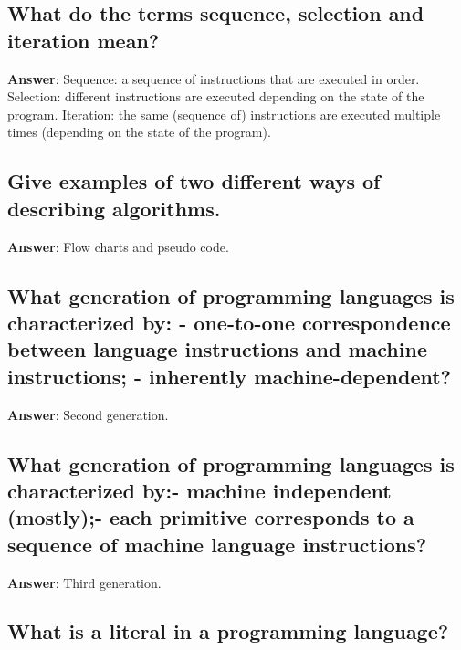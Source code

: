 \documentclass[a4paper,11pt,oneside]{article}
\begin{document}
\begin{sloppypar}
\subsection{What do the terms sequence, selection and iteration mean?}

\label{q:207:sa:en:True}

\textbf{Answer}: Sequence: a sequence of instructions that are executed in order. Selection: different instructions are executed depending on the state of the program. Iteration: the same (sequence of) instructions are executed multiple times (depending on the state of the program).



\subsection{Give examples of two different ways of describing algorithms.}

\label{q:208:sa:en:True}

\textbf{Answer}: Flow charts and pseudo code.



\subsection{What generation of programming languages is characterized by: - one-to-one correspondence between language instructions and machine instructions; - inherently machine-dependent?}

\label{q:209:sa:en:True}

\textbf{Answer}: Second generation.



\subsection{What generation of programming languages is characterized by:- machine independent (mostly);- each primitive corresponds to a sequence of machine language instructions?}

\label{q:210:sa:en:True}

\textbf{Answer}: Third generation.



\subsection{What is a literal in a programming language?}

\label{q:211:sa:en:True}


\end{sloppypar}
\end{document}
